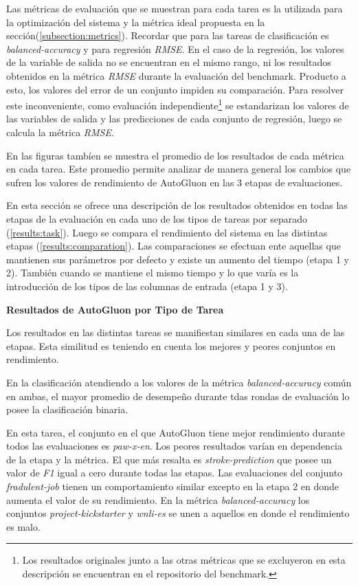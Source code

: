 Las métricas de evaluación que se muestran para cada tarea es la utilizada para la optimización del sistema y la métrica ideal propuesta en la 
sección(\ref{subsection:metrics}). Recordar que para las tareas de clasificación es \textit{balanced-accuracy} y para regresión \textit{RMSE}.
En el caso de la regresión, los valores de la variable de salida no se encuentran en el mismo rango, ni los resultados obtenidos en la métrica \textit{RMSE} 
durante la evaluación del benchmark. Producto a esto, los valores del error de un conjunto impiden su comparación. Para resolver este inconveniente,
como evaluación independiente\footnote{Los resultados originales junto a las otras métricas que se excluyeron en esta descripción se encuentran en el repositorio del 
benchmark.} se estandarizan los valores de las variables de salida y las predicciones de cada conjunto de regresión, luego se calcula la métrica 
\textit{RMSE}.

En las figuras tambíen se muestra el promedio de los resultados de cada métrica en cada tarea. Este promedio permite analizar de manera general los cambios que 
sufren los valores de rendimiento de AutoGluon en las 3 etapas de evaluaciones.

En esta sección se ofrece una descripción de los resultados obtenidos en todas las etapas de la evaluación en cada uno de los tipos de tareas por 
separado (\ref{results:task}). 
Luego se compara el rendimiento del sistema en las distintas etapas (\ref{results:comparation}). Las comparaciones se efectuan ente aquellas que 
mantienen sus parámetros por defecto y existe un aumento del tiempo (etapa 1 y 2). 
También cuando se mantiene el mismo tiempo y lo que varía es la introducción de los tipos de las columnas de entrada (etapa 1 y 3).


\begin{flushleft} 
  {\large { \textbf{Resultados de AutoGluon por Tipo de Tarea}}}\label{results:task}
\end{flushleft}

Los resultados en las distintas tareas se manifiestan similares en cada una de las etapas. Esta similitud es teniendo en cuenta los mejores y peores conjuntos en 
rendimiento.

En la clasificación atendiendo a los valores de la métrica \textit{balanced-accuracy} común en ambas, el mayor promedio de desempeño durante tdas rondas de evaluación 
lo posee la clasificación binaria.

En esta tarea, el conjunto en el que AutoGluon tiene mejor rendimiento durante todos las evaluaciones es \textit{paw-x-en}. Los peores resultados varían en dependencia de la etapa y la 
métrica. El que más resalta es \textit{stroke-prediction} que posee un valor de \textit{F1} igual a cero durante todas las etapas. Las evaluaciones del conjunto 
\textit{fradulent-job} tienen un comportamiento similar excepto en la etapa 2 en donde aumenta el valor de su rendimiento. En la métrica \textit{balanced-accuracy} 
los conjuntos \textit{project-kickstarter} y \textit{wnli-es} se unen a aquellos en donde el rendimiento es malo.

